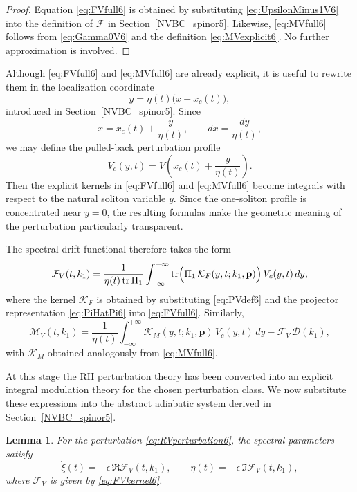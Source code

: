 \documentclass[11pt]{amsart}
\newtheorem{lemma}{Lemma}[section]
\theoremstyle{definition}
\numberwithin{equation}{section}
\begin{document}
\begin{proof}
Equation \eqref{eq:FVfull6} is obtained by substituting \eqref{eq:UpsilonMinus1V6} into the definition of $\mathcal F$ in Section~\ref{NVBC_spinor5}. Likewise, \eqref{eq:MVfull6} follows from \eqref{eq:Gamma0V6} and the definition \eqref{eq:MVexplicit6}. No further approximation is involved.
\end{proof}

Although \eqref{eq:FVfull6} and \eqref{eq:MVfull6} are already explicit, it is useful to rewrite them in the localization coordinate
\[
y=\eta(t)\bigl(x-x_c(t)\bigr),
\]
introduced in Section~\ref{NVBC_spinor5}. Since
\[
x=x_c(t)+\frac{y}{\eta(t)},
\qquad
dx=\frac{dy}{\eta(t)},
\]
we may define the pulled-back perturbation profile
\begin{equation}
V_c(y,t)=V\!\left(x_c(t)+\frac{y}{\eta(t)}\right).
\label{eq:Vcdef6}
\end{equation}
Then the explicit kernels in \eqref{eq:FVfull6} and \eqref{eq:MVfull6} become integrals with respect to the natural soliton variable \(y\). Since the one-soliton profile is concentrated near \(y=0\), the resulting formulas make the geometric meaning of the perturbation particularly transparent.

The spectral drift functional therefore takes the form
\begin{equation}
\mathcal F_V(t,k_1)
=
\frac{1}{\eta(t)\operatorname{tr}\Pi_1}
\int_{-\infty}^{+\infty}
\operatorname{tr}\Bigl(
\Pi_1\,\mathcal K_F(y,t;k_1,\mathbf p)
\Bigr)\,
V_c(y,t)\,dy,
\label{eq:FVkernel6}
\end{equation}
where the kernel \(\mathcal K_F\) is obtained by substituting \eqref{eq:PVdef6} and the projector representation \eqref{eq:PiHatPi6} into \eqref{eq:FVfull6}. Similarly,
\begin{equation}
\mathcal M_V(t,k_1)
=
\frac{1}{\eta(t)}
\int_{-\infty}^{+\infty}
\mathcal K_M(y,t;k_1,\mathbf p)\,
V_c(y,t)\,dy
-
\mathcal F_V\,\mathcal D(k_1),
\label{eq:MVkernel6}
\end{equation}
with \(\mathcal K_M\) obtained analogously from \eqref{eq:MVfull6}.

At this stage the RH perturbation theory has been converted into an explicit integral modulation theory for the chosen perturbation class. We now substitute these expressions into the abstract adiabatic system derived in Section~\ref{NVBC_spinor5}.

\begin{lemma}
For the perturbation \eqref{eq:RVperturbation6}, the spectral parameters satisfy
\begin{equation}
\dot{\xi}(t)
=
-\epsilon\,\Re \mathcal F_V(t,k_1),
\qquad
\dot{\eta}(t)
=
-\epsilon\,\Im \mathcal F_V(t,k_1),
\label{eq:xietaExplicit6}
\end{equation}
where \(\mathcal F_V\) is given by \eqref{eq:FVkernel6}.
\end{lemma}
\end{document}
